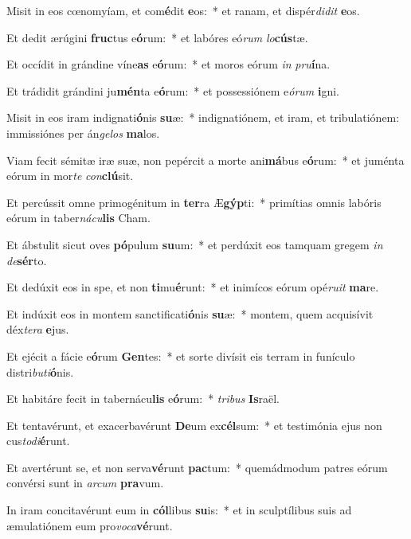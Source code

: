 \item Misit in eos cœnomyíam, et com\textbf{é}dit \textbf{e}os:~* et ranam, et dispér\textit{di}\textit{dit} \textbf{e}os.
\item Et dedit ærúgini \textbf{fruc}tus e\textbf{ó}rum:~* et labóres eó\textit{rum} \textit{lo}\textbf{cús}tæ.
\item Et occídit in grándine víne\textbf{as} e\textbf{ó}rum:~* et moros eórum \textit{in} \textit{pru}\textbf{í}na.
\item Et trádidit grándini ju\textbf{mén}ta e\textbf{ó}rum:~* et possessiónem e\textit{ó}\textit{rum} \textbf{i}gni.
\item Misit in eos iram indignati\textbf{ó}nis \textbf{su}æ:~* indignatiónem, et iram, et tribulatiónem: immissiónes per án\textit{ge}\textit{los} \textbf{ma}los.
\item Viam fecit sémitæ iræ suæ, non pepércit a morte ani\textbf{má}bus e\textbf{ó}rum:~* et juménta eórum in mor\textit{te} \textit{con}\textbf{clú}sit.
\item Et percússit omne primogénitum in \textbf{ter}ra Æ\textbf{gýp}ti:~* primítias omnis labóris eórum in taber\textit{ná}\textit{cu}\textbf{lis} Cham.
\item Et ábstulit sicut oves \textbf{pó}pulum \textbf{su}um:~* et perdúxit eos tamquam gregem \textit{in} \textit{de}\textbf{sér}to.
\item Et dedúxit eos in spe, et non \textbf{ti}mu\textbf{é}runt:~* et inimícos eórum opé\textit{ru}\textit{it} \textbf{ma}re.
\item Et indúxit eos in montem sanctificati\textbf{ó}nis \textbf{su}æ:~* montem, quem acquisívit déx\textit{te}\textit{ra} \textbf{e}jus.
\item Et ejécit a fácie e\textbf{ó}rum \textbf{Gen}tes:~* et sorte divísit eis terram in funículo distri\textit{bu}\textit{ti}\textbf{ó}nis.
\item Et habitáre fecit in tabernácu\textbf{lis} e\textbf{ó}rum:~* \textit{tri}\textit{bus} \textbf{Is}raël.
\item Et tentavérunt, et exacerbavérunt \textbf{De}um ex\textbf{cél}sum:~* et testimónia ejus non cus\textit{to}\textit{di}\textbf{é}runt.
\item Et avertérunt se, et non serva\textbf{vé}runt \textbf{pac}tum:~* quemádmodum patres eórum convérsi sunt in \textit{ar}\textit{cum} \textbf{pra}vum.
\item In iram concitavérunt eum in \textbf{cól}libus \textbf{su}is:~* et in sculptílibus suis ad æmulatiónem eum pro\textit{vo}\textit{ca}\textbf{vé}runt.
